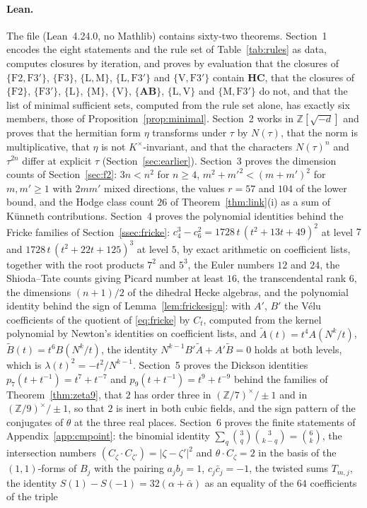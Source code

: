\documentclass[11pt,reqno]{amsart}
\numberwithin{equation}{section}
\theoremstyle{plain}
\theoremstyle{definition}
\newcommand{\ZZ}{\mathbb{Z}}
\newcommand{\HC}{\mathbf{HC}}
\newcommand{\AB}{\mathbf{AB}}
\begin{document}
\paragraph{Lean.} The file  (Lean~4.24.0, no Mathlib) contains sixty-two theorems. Section~1 encodes the eight statements and the rule set of Table~\ref{tab:rules} as data, computes closures by iteration, and proves by evaluation that the closures of $\{\mathrm{F2},\mathrm{F3}'\}$, $\{\mathrm{F3}\}$, $\{\mathrm{L},\mathrm{M}\}$, $\{\mathrm{L},\mathrm{F3}'\}$ and $\{\mathrm{V},\mathrm{F3}'\}$ contain $\HC$, that the closures of $\{\mathrm{F2}\}$, $\{\mathrm{F3}'\}$, $\{\mathrm{L}\}$, $\{\mathrm{M}\}$, $\{\mathrm{V}\}$, $\{\AB\}$, $\{\mathrm{L},\mathrm{V}\}$ and $\{\mathrm{M},\mathrm{F3}'\}$ do not, and that the list of minimal sufficient sets, computed from the rule set alone, has exactly six members, those of Proposition~\ref{prop:minimal}. Section~2 works in $\ZZ[\sqrt{-d}]$ and proves that the hermitian form $\eta$ transforms under $\tau$ by $N(\tau)$, that the norm is multiplicative, that $\eta$ is not $K^{\times}$-invariant, and that the characters $N(\tau)^{n}$ and $\tau^{2n}$ differ at explicit $\tau$ (Section~\ref{sec:earlier}). Section~3 proves the dimension counts of Section~\ref{sec:f2}: $3n<n^{2}$ for $n\ge4$, $m^{2}+m'^{2}<(m+m')^{2}$ for $m,m'\ge1$ with $2mm'$ mixed directions, the values $r=57$ and $104$ of the lower bound, and the Hodge class count $26$ of Theorem~\ref{thm:link}(i) as a sum of K\"unneth contributions. Section~4 proves the polynomial identities behind the Fricke families of Section~\ref{ssec:fricke}: $c_{4}^{3}-c_{6}^{2}=1728\,t\,(t^{2}+13t+49)^{2}$ at level $7$ and $1728\,t\,(t^{2}+22t+125)^{3}$ at level $5$, by exact arithmetic on coefficient lists, together with the root products $7^{2}$ and $5^{3}$, the Euler numbers $12$ and $24$, the Shioda--Tate counts giving Picard number at least $16$, the transcendental rank $6$, the dimensions $(n+1)/2$ of the dihedral Hecke algebras, and the polynomial identity behind the sign of Lemma~\ref{lem:frickesign}: with $A'$, $B'$ the V\'elu coefficients of the quotient of \eqref{eq:fricke} by $C_{t}$, computed from the kernel polynomial by Newton's identities on coefficient lists, and $\tilde A(t)=t^{4}A(N^{k}/t)$, $\tilde B(t)=t^{6}B(N^{k}/t)$, the identity $N^{k-1}B'\tilde A+A'\tilde B=0$ holds at both levels, which is $\lambda(t)^{2}=-t^{2}/N^{k-1}$. Section~5 proves the Dickson identities $p_{7}(t+t^{-1})=t^{7}+t^{-7}$ and $p_{9}(t+t^{-1})=t^{9}+t^{-9}$ behind the families of Theorem~\ref{thm:zeta9}, that $2$ has order three in $(\ZZ/7)^{\times}/\pm1$ and in $(\ZZ/9)^{\times}/\pm1$, so that $2$ is inert in both cubic fields, and the sign pattern of the conjugates of $\theta$ at the three real places. Section~6 proves the finite statements of Appendix~\ref{app:cmpoint}: the binomial identity $\sum_{q}\binom{3}{q}\binom{3}{k-q}=\binom{6}{k}$, the intersection numbers $(C_{\zeta}\cdot C_{\zeta'})=|\zeta-\zeta'|^{2}$ and $\theta\cdot C_{\zeta}=2$ in the basis of the $(1,1)$-forms of $B_{j}$ with the pairing $a_{j}b_{j}=1$, $c_{j}\bar c_{j}=-1$, the twisted sums $T_{m,j}$, the identity $S(1)-S(-1)=32(\alpha+\bar\alpha)$ as an equality of the $64$ coefficients of the triple 
\end{document}
